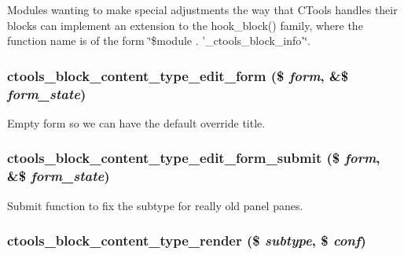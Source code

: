 Modules wanting to make special adjustments the way that CTools handles their blocks can implement an extension to the hook\_\-block() family, where the function name is of the form \char`\"{}\$module . '\_\-ctools\_\-block\_\-info'\char`\"{}. \hypertarget{block_8inc_a3d85f91ceefbd673b09278f045e0f9ec}{
\subsubsection[{ctools\_\-block\_\-content\_\-type\_\-edit\_\-form}]{\setlength{\rightskip}{0pt plus 5cm}ctools\_\-block\_\-content\_\-type\_\-edit\_\-form (\$ {\em form}, \/  \&\$ {\em form\_\-state})}}
\label{block_8inc_a3d85f91ceefbd673b09278f045e0f9ec}
Empty form so we can have the default override title. \hypertarget{block_8inc_ad001208c265600dc08420e74250af638}{
\subsubsection[{ctools\_\-block\_\-content\_\-type\_\-edit\_\-form\_\-submit}]{\setlength{\rightskip}{0pt plus 5cm}ctools\_\-block\_\-content\_\-type\_\-edit\_\-form\_\-submit (\$ {\em form}, \/  \&\$ {\em form\_\-state})}}
\label{block_8inc_ad001208c265600dc08420e74250af638}
Submit function to fix the subtype for really old panel panes. \hypertarget{block_8inc_ae59c8b95fd7a929577b25a09a67841e8}{
\subsubsection[{ctools\_\-block\_\-content\_\-type\_\-render}]{\setlength{\rightskip}{0pt plus 5cm}ctools\_\-block\_\-content\_\-type\_\-render (\$ {\em subtype}, \/  \$ {\em conf})}}
\label{block_8inc_ae59c8b95fd7a929577b25a09a67841e8}
